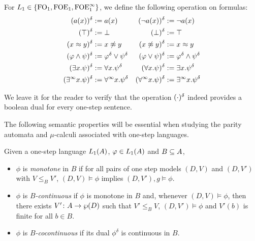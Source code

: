\begin{definition}
\label{def:concreteduals} 
For $L_{1} \in \{ \mathrm{FO}_1, \mathrm{FOE}_1, \mathrm{FOE}^{\infty}_1 \}$, we define the following operation
on formulas:
\begin{align*}
 (a(x))^{\delta} & \mathrel{:=}  a(x) 
 & (\lnot a(x))^{\delta} & \mathrel{:=}  \lnot a(x) 
\\ (\top)^{\delta} & \mathrel{:=}  \bot 
  & (\bot)^{\delta} & \mathrel{:=}  \top 
\\  (x \approx y)^{\delta} & \mathrel{:=}  x \not\approx y 
  & (x \not\approx y)^{\delta}& \mathrel{:=}  x \approx y 
\\ (\varphi \wedge \psi)^{\delta} &\mathrel{:=}  \varphi^{\delta} \vee \psi^{\delta} 
  &(\varphi \vee \psi)^{\delta}& \mathrel{:=}  \varphi^{\delta} \wedge \psi^{\delta}
\\ (\exists x.\psi)^{\delta} &\mathrel{:=}  \forall x.\psi^{\delta} 
  &(\forall x.\psi)^{\delta} &\mathrel{:=}  \exists x.\psi^{\delta} 
\\ (\exists^\infty x.\psi)^{\delta} &\mathrel{:=} \forall^\infty x.\psi^{\delta} 
  &(\forall^\infty x.\psi)^{\delta} &\mathrel{:=}  \exists^\infty x.\psi^{\delta}
\end{align*}
\end{definition}
We leave it for the reader to verify that the operation $(\cdot)^{\delta}$ indeed 
provides a boolean dual for every one-step sentence.
\medskip

The following semantic properties will be essential when studying the 
parity automata and $\mu$-calculi associated with one-step languages.

\begin{definition}\label{def:semnotions} 
Given a one-step language $L_{1}(A)$, $\varphi \in L_{1}(A)$ and $B \subseteq A$,
\begin{itemize}
\item 
$\phi$ is \emph{monotone} in $B$ if for all pairs of one step models $(D,V)$ 
and $(D,V')$ with $V \leq_{B} V'$, $(D,V) \models \phi$ implies $(D,V'),g 
\models \phi$.
\item 
$\phi$ is \emph{$B$-continuous} if $\phi$ is monotone in $B$ and, whenever 
$(D,V) \models \phi$, then there exists $V' \colon A \to \wp(D)$ such that 
$V' \leq_{B} V$, $(D,V') \models \phi$ and $V'(b)$ is finite for all $b \in B$.
\item 
$\phi$ is \emph{$B$-cocontinuous} if its dual $\phi^{\delta}$ is continuous in 
$B$.
\end{itemize}
\end{definition}


